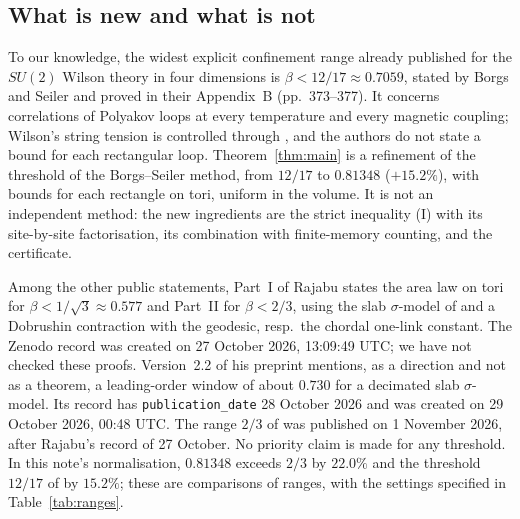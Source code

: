 \documentclass[11pt,a4paper]{article}
\theoremstyle{plain}
\theoremstyle{remark}
\numberwithin{equation}{section}
\begin{document}
\subsection{What is new and what is not}
To our knowledge, the widest explicit confinement range already published for the $SU(2)$ Wilson theory in four dimensions
is $\beta<12/17\approx0.7059$, stated by Borgs and Seiler \cite[(II.55), p.~343]{BS83} and proved in their Appendix~B (pp.~373--377).
It concerns correlations of Polyakov loops at every temperature and every magnetic coupling; Wilson's string tension is controlled through \cite[(II.50), p.~341]{BS83}, and the
authors do not state a bound for each rectangular loop. Theorem~\ref{thm:main} is a refinement of the threshold of the Borgs--Seiler
method, from $12/17$ to $0.81348$ ($+15.2\%$), with bounds for each rectangle on tori, uniform in the volume. It is not an independent
method: the new ingredients are the strict inequality (I) with its site-by-site factorisation, its combination with finite-memory
counting, and the certificate.

Among the other public statements, Part~I of Rajabu \cite[Cor.~6.5]{Raj26a} states the area law on tori for $\beta<1/\sqrt3\approx0.577$ and Part~II \cite[Cor.~7.7(iii)]{Raj26a} for $\beta<2/3$, using the slab $\sigma$-model of \cite{DF80} and a Dobrushin contraction with the geodesic, resp.\ the chordal one-link constant. The Zenodo record was created on 27 October 2026, 13:09:49 UTC; we have not checked these proofs. Version~2.2 of his preprint \cite[\S8, item (iv)]{Raj26b} mentions, as a direction and not as a theorem, a leading-order window of about $0.730$ for a decimated slab $\sigma$-model. Its record has \texttt{publication\_date} 28 October 2026 and was created on 29 October 2026, 00:48 UTC. The range $2/3$ of \cite[Thm.~7.1]{D7} was published on 1 November 2026, after Rajabu's record of 27 October. No priority claim is made for any threshold. In this note's normalisation, $0.81348$ exceeds $2/3$ by $22.0\%$ and the threshold $12/17$ of \cite{BS83} by $15.2\%$; these are comparisons of ranges, with the settings specified in Table~\ref{tab:ranges}.
\end{document}
